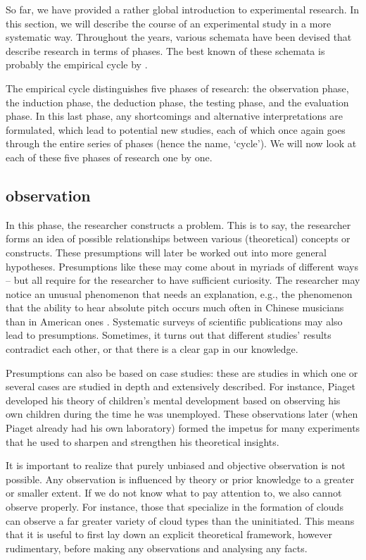 \documentclass[
]{book}
\begin{document}
So far, we have provided a rather global introduction to experimental research. In this section, we will describe the course of an experimental study in a more systematic way. Throughout the years, various schemata have been devised that describe research in terms of phases. The best known of these schemata is probably the empirical cycle by \citet{Groot61}.

The empirical cycle distinguishes five phases of research: the observation phase, the induction phase, the deduction phase, the testing phase, and the evaluation phase. In this last phase, any shortcomings and alternative interpretations are formulated, which lead to potential new studies, each of which once again goes through the entire series of phases (hence the name, `cycle'). We will now look at each of these five phases of research one by one.

\subsection{observation}\label{observation}

In this phase, the researcher constructs a problem. This is to say, the researcher forms an idea of possible relationships between various (theoretical) concepts or constructs. These presumptions will later be worked out into more general hypotheses. Presumptions like these may come about in myriads of different ways -- but all require for the researcher to have sufficient curiosity. The researcher may notice an unusual phenomenon that needs an explanation, e.g., the phenomenon that the ability to hear absolute pitch occurs much often in Chinese musicians than in American ones \citep{Deut06}.
Systematic surveys of scientific publications may also lead to presumptions. Sometimes, it turns out that different studies' results contradict each other, or that there is a clear gap in our knowledge.

Presumptions can also be based on case studies: these are studies in which one or several cases are studied in depth and extensively described. For instance, Piaget developed his theory of children's mental development based on observing his own children during the time he was unemployed. These observations later (when Piaget already had his own laboratory) formed the impetus for many experiments that he used to sharpen and strengthen his theoretical insights.

It is important to realize that purely unbiased and objective observation is not possible. Any observation is influenced by theory or prior knowledge to a greater or smaller extent. If we do not know what to pay attention to, we also cannot observe properly. For instance, those that specialize in the formation of clouds can observe a far greater variety of cloud types than the uninitiated. This means that it is useful to first lay down an explicit theoretical framework, however rudimentary, before making any observations and analysing any facts.
\end{document}
